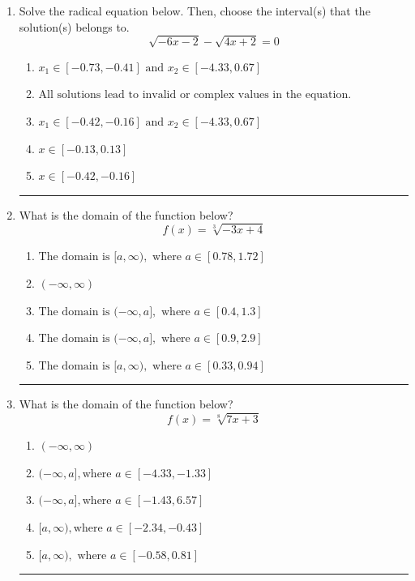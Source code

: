 \documentclass[14pt]{extbook}
\newcommand{\litem}[1]{\item#1\hspace*{-1cm}\rule{\textwidth}{0.4pt}}
\begin{document}
\begin{enumerate}
{\begin{enumerate}[label=\Alph*.]
\end{enumerate} }
\litem{
Solve the radical equation below. Then, choose the interval(s) that the solution(s) belongs to.\[ \sqrt{-6 x - 2} - \sqrt{4 x + 2} = 0 \]\begin{enumerate}[label=\Alph*.]
\item \( x_1 \in [-0.73, -0.41] \text{ and } x_2 \in [-4.33,0.67] \)
\item \( \text{All solutions lead to invalid or complex values in the equation.} \)
\item \( x_1 \in [-0.42, -0.16] \text{ and } x_2 \in [-4.33,0.67] \)
\item \( x \in [-0.13,0.13] \)
\item \( x \in [-0.42,-0.16] \)

\end{enumerate} }
\litem{
What is the domain of the function below?\[ f(x) = \sqrt[3]{-3 x + 4} \]\begin{enumerate}[label=\Alph*.]
\item \( \text{The domain is } [a, \infty), \text{   where } a \in [0.78, 1.72] \)
\item \( (-\infty, \infty) \)
\item \( \text{The domain is } (-\infty, a], \text{   where } a \in [0.4, 1.3] \)
\item \( \text{The domain is } (-\infty, a], \text{   where } a \in [0.9, 2.9] \)
\item \( \text{The domain is } [a, \infty), \text{   where } a \in [0.33, 0.94] \)

\end{enumerate} }
\litem{
What is the domain of the function below?\[ f(x) = \sqrt[8]{7 x + 3} \]\begin{enumerate}[label=\Alph*.]
\item \( (-\infty, \infty) \)
\item \( (-\infty, a], \text{where } a \in [-4.33, -1.33] \)
\item \( (-\infty, a], \text{where } a \in [-1.43, 6.57] \)
\item \( [a, \infty), \text{where } a \in [-2.34, -0.43] \)
\item \( [a, \infty), \text{ where } a \in [-0.58, 0.81] \)


\end{enumerate}}
\end{enumerate}
\end{document}
